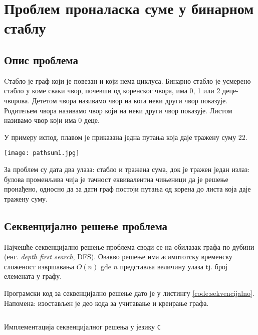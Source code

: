 
\section{Проблем проналаска суме у бинарном стаблу}

\subsection{Опис проблема}
Cтабло је граф који је повезан и који нема циклуса.
Бинарно стабло је усмерено стабло у коме сваки чвор, почевши од коренског чвора, има 0, 1 или 2 деце-чворова. Дететом чвора називамо чвор на кога неки други чвор показује.
Родитељем чвора називамо чвор који на неки други чвор показује. Листом називамо чвор који има 0 деце.

У примеру испод, плавом је приказана једна путања која даје тражену суму 22.

\texttt{[image: pathsum1.jpg]}

За проблем су дата два улаза: стабло и тражена сума, док је тражен један излаз: булова променљива чија је тачност еквивалентна чињеници да је решење пронађено, односно
да за дати граф постоји путања од корена до листа која даје тражену суму.



\subsection{Секвенцијално решење проблема}

Најчешће секвенцијално решење проблема своди се на обилазак графа по дубини (енг. \textit{depth first search}, DFS).
Овакво решење има асимптотску временску сложеност извршавања $O(n)$ gde $n$ представља величину улаза tj. број елемената у графу.

Програмски код за секвенцијално решење дато је у листингу \ref{code:sekvencijalno}. Напомена: изостављен је део кода за учитавање и креирање графа.

\begin{listing}
\inputminted{c}{kodovi/basic.c}
\caption{Имплементација секвенцијалног решења у језику \texttt{C}}
\label{code:sekvencijalno}
\end{listing}

\pagebreak
